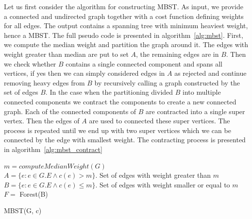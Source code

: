\documentclass[runningheads, a4paper]{llncs}
\begin{document}
Let us first consider the algorithm for constructing MBST. As input, we provide a connected and undirected graph together with a cost function defining weights for all edges. The output contains a spanning tree with minimum heaviest weight, hence a MBST. The full pseudo code is presented in algorithm~\ref{alg:mbst}. First, we compute the median weight and partition the graph around it. The edges with weight greater than median are put to set $A$, the remaining edges are in $B$. Then we check whether $B$ contains a single connected component and spans all vertices, if yes then we can simply considered edges in $A$ as rejected and continue removing heavy edges from $B$ by recursively calling a graph constructed by the set of edges $B$. In the case when the partitioning divided $B$ into multiple connected components we contract the components to create a new connected graph. Each of the connected components of $B$ are contracted into a single super vertex. Then the edges of $A$ are used to connected these super vertices. The process is repeated until we end up with two super vertices which we can be connected by the edge with smallest weight.
The contracting process is presented in algorithm~\ref{alg:mbst_contract}
        
\begin{algorithm}[H]
    
    
    $m = computeMedianWeight(G)$ \\
    $A = \{e : {e {\in G.E}} \land c(e) > m \}$. Set of edges with weight greater than $m$ \\
    $B = \{e : {e{\in G.E}} \land c(e) \leq m \}$. Set of edges with weight smaller or equal to $m$ \\
    $F =$ Forest(B) \\
    
    
    \caption{MBST(G, c)}
    \label{alg:mbst}
\end{algorithm}
\end{document}
